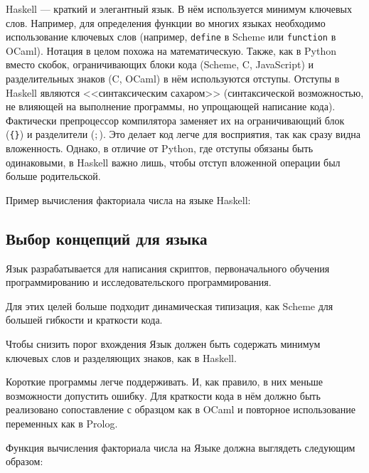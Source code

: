         Haskell --- краткий и элегантный язык\cite{haskell}.
        В нём используется минимум ключевых слов.
        Например, для определения функции во многих языках необходимо использование ключевых слов (например, \verb!define! в Scheme или \verb!function! в OCaml).
        Нотация в целом похожа на математическую.
        Также, как в Python вместо скобок, ограничивающих блоки кода (Scheme, C, JavaScript) и разделительных знаков (C, OCaml) в нём используются отступы.
        Отступы в Haskell являются <<синтаксическим сахаром>> (синтаксической возможностью, не влияющей на выполнение программы, но упрощающей написание кода).
        Фактически препроцессор компилятора заменяет их на ограничивающий блок (\verb${}$) и разделители ($;$).
        Это делает код легче для восприятия, так как сразу видна вложенность.
        Однако, в отличие от Python, где отступы обязаны быть одинаковыми, в Haskell важно лишь, чтобы отступ вложенной операции был больше родительской.

        Пример вычисления факториала числа на языке Haskell:

        

    \subsection{Выбор концепций для языка}
        Язык разрабатывается для написания скриптов, первоначального обучения программированию и исследовательского программирования.

        Для этих целей больше подходит динамическая типизация, как Scheme для большей гибкости и краткости кода.

        Чтобы снизить порог вхождения Язык должен быть содержать минимум ключевых слов и разделяющих знаков, как в Haskell.

        Короткие программы легче поддерживать.
        И, как правило, в них меньше возможности допустить ошибку.
        Для краткости кода в нём должно быть реализовано сопоставление с образцом как в OCaml и повторное использование переменных как в Prolog.

        Функция вычисления факториала числа на Языке должна выглядеть следующим образом:

        
